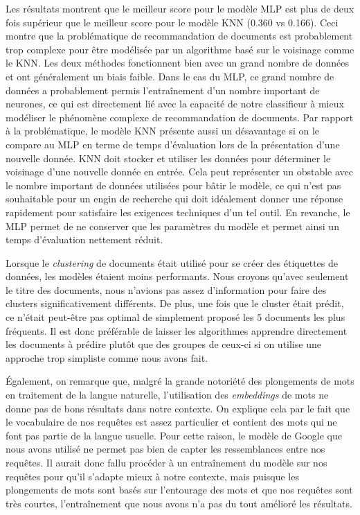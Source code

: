 Les résultats montrent que le meilleur score pour le modèle MLP est plus de deux fois supérieur que le meilleur score pour le modèle KNN (0.360 vs 0.166). 
Ceci montre que la problématique de recommandation de documents est probablement trop complexe pour être modélisée par un algorithme basé sur le voisinage comme le KNN. 
Les deux méthodes fonctionnent bien avec un grand nombre de données et ont généralement un biais faible. 
Dans le cas du MLP, ce grand nombre de données a probablement permis l'entraînement d'un nombre important de neurones, ce qui est directement lié avec la capacité de notre classifieur à mieux modéliser le phénomène complexe de recommandation de documents. 
Par rapport à la problématique, le modèle KNN présente aussi un désavantage si on le compare au MLP en terme de temps d'évaluation lors de la présentation d'une nouvelle donnée. KNN doit stocker et utiliser les données pour déterminer le voisinage d'une nouvelle donnée en entrée. 
Cela peut représenter un obstable avec le nombre important de données utilisées pour bâtir le modèle, ce qui n'est pas souhaitable pour un engin de recherche qui doit idéalement donner une réponse rapidement pour satisfaire les exigences techniques d'un tel outil. 
En revanche, le MLP permet de ne conserver que les paramètres du modèle et permet ainsi un temps d'évaluation nettement réduit.
\break

Lorsque le \textit{clustering} de documents était utilisé pour se créer des étiquettes de données, les modèles étaient moins performants. 
Nous croyons qu'avec seulement le titre des documents, nous n'avions pas assez d'information pour faire des clusters significativement différents. 
De plus, une fois que le cluster était prédit, ce n'était peut-être pas optimal de simplement proposé les 5 documents les plus fréquents. 
Il est donc préférable de laisser les algorithmes apprendre directement les documents à prédire plutôt que des groupes de ceux-ci si on utilise une approche trop simpliste comme nous avons fait.
\break

Également, on remarque que, malgré la grande notoriété des plongements de mots en traitement de la langue naturelle, l'utilisation des \emph{embeddings} de mots ne donne pas de bons résultats dans notre contexte.
On explique cela par le fait que le vocabulaire de nos requêtes est assez particulier et contient des mots qui ne font pas partie de la langue usuelle.
Pour cette raison, le modèle de Google que nous avons utilisé ne permet pas bien de capter les ressemblances entre nos requêtes. 
Il aurait donc fallu procéder à un entraînement du modèle sur nos requêtes pour qu'il s'adapte mieux à notre contexte, mais puisque les plongements de mots sont basés sur l'entourage des mots et que nos requêtes sont très courtes, l'entraînement que nous avons n'a pas du tout amélioré les résultats.

